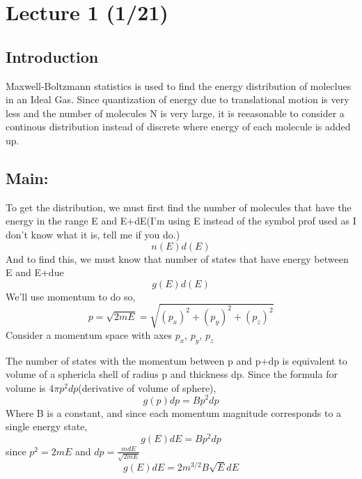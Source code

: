 
\section[Lecture 1 (Date) -- {\it Molecular Energies in an Ideal Gas}]{Lecture 1 (1/21)}

\subsection{Introduction}
Maxwell-Boltzmann statistics is used to find the energy distribution of moleclues in an Ideal Gas.
Since quantization of energy due to translational motion is very less and the number of molecules N is 
very large, it is reeasonable to consider a continous distribution instead of discrete where energy of each 
molecule is added up.

\subsection{Main:}
To get the distribution, we must first find the number of molecules that have the energy in the range E and E+dE(I'm using E instead of the symbol prof used as I don't know what it is, tell me if you do.)
$$n(E)d(E)$$
And to find this, we must know that number of states that have energy between E and E+due
$$g(E)d(E)$$
We'll use momentum to do so, 
$$p=\sqrt{2mE}=\sqrt{(p_{x})^2+(p_{y})^2+(p_{z})^2}$$
Consider a momentum space with axes $p_{x}$, $p_{y}$, $p_{z}$

The number of states with the momentum between p and p+dp is equivalent to volume of a sphericla shell of radius p and thickness dp.
Since the formula for volume is $4{\pi}p^2dp$(derivative of volume of sphere), 
$$g(p)dp=Bp^2dp$$
Where B is a constant, and since each momentum magnitude corresponds to a single energy state, 
$$g(E)dE=Bp^2dp$$
since $p^2=2mE$ and $dp=\frac{mdE}{\sqrt{2mE}}$
$$g(E)d{E}=2m^{3/2}B\sqrt{E}dE$$

